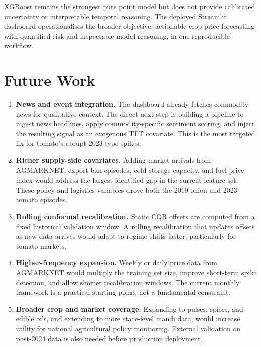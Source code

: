 \documentclass[12pt,a4paper]{report}
\begin{document}
XGBoost remains the strongest pure point model but does not provide calibrated uncertainty
or interpretable temporal reasoning. The deployed Streamlit dashboard operationalises the
broader objective: actionable crop price forecasting with quantified risk and inspectable
model reasoning, in one reproducible workflow.

\section{Future Work}

\begin{enumerate}
    \item \textbf{News and event integration.} The dashboard already fetches commodity news
    for qualitative context. The direct next step is building a pipeline to ingest news
    headlines, apply commodity-specific sentiment scoring, and inject the resulting signal
    as an exogenous TFT covariate. This is the most targeted fix for tomato's abrupt
    2023-type spikes.

    \item \textbf{Richer supply-side covariates.} Adding market arrivals from AGMARKNET,
    export ban episodes, cold storage capacity, and fuel price index would address the
    largest identified gap in the current feature set. These policy and logistics variables
    drove both the 2019 onion and 2023 tomato episodes.

    \item \textbf{Rolling conformal recalibration.} Static CQR offsets are computed from a
    fixed historical validation window. A rolling recalibration that updates offsets as new
    data arrives would adapt to regime shifts faster, particularly for tomato markets.

    \item \textbf{Higher-frequency expansion.} Weekly or daily price data from AGMARKNET
    would multiply the training set size, improve short-term spike detection, and allow
    shorter recalibration windows. The current monthly framework is a practical starting
    point, not a fundamental constraint.

    \item \textbf{Broader crop and market coverage.} Expanding to pulses, spices, and
    edible oils, and extending to more state-level mandi data, would increase utility for
    national agricultural policy monitoring. External validation on post-2024 data is also
    needed before production deployment.
\end{enumerate}
\end{document}
